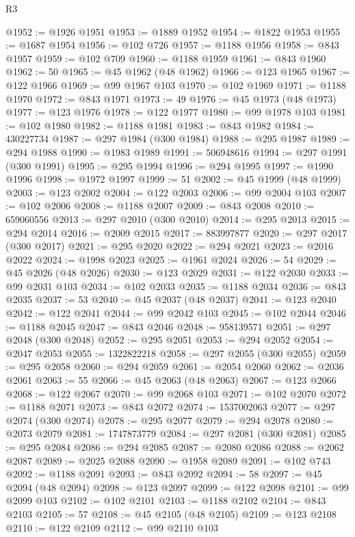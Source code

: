 \begin{lexlean}{R3}
\begin{coremodule}
@1952 := @1926 @1951
@1953 := @1889 @1952
@1954 := @1822 @1953
@1955 := @1687 @1954
@1956 := @102 @726
@1957 := @1188 @1956
@1958 := @843 @1957
@1959 := @102 @709
@1960 := @1188 @1959
@1961 := @843 @1960
@1962 := 50
@1965 := @45 @1962 (@48 @1962)
@1966 := @123 @1965
@1967 := @122 @1966
@1969 := @99 @1967 @103
@1970 := @102 @1969
@1971 := @1188 @1970
@1972 := @843 @1971
@1973 := 49
@1976 := @45 @1973 (@48 @1973)
@1977 := @123 @1976
@1978 := @122 @1977
@1980 := @99 @1978 @103
@1981 := @102 @1980
@1982 := @1188 @1981
@1983 := @843 @1982
@1984 := 430227734
@1987 := @297 @1984 (@300 @1984)
@1988 := @295 @1987
@1989 := @294 @1988
@1990 := @1983 @1989
@1991 := 506948616
@1994 := @297 @1991 (@300 @1991)
@1995 := @295 @1994
@1996 := @294 @1995
@1997 := @1990 @1996
@1998 := @1972 @1997
@1999 := 51
@2002 := @45 @1999 (@48 @1999)
@2003 := @123 @2002
@2004 := @122 @2003
@2006 := @99 @2004 @103
@2007 := @102 @2006
@2008 := @1188 @2007
@2009 := @843 @2008
@2010 := 659060556
@2013 := @297 @2010 (@300 @2010)
@2014 := @295 @2013
@2015 := @294 @2014
@2016 := @2009 @2015
@2017 := 883997877
@2020 := @297 @2017 (@300 @2017)
@2021 := @295 @2020
@2022 := @294 @2021
@2023 := @2016 @2022
@2024 := @1998 @2023
@2025 := @1961 @2024
@2026 := 54
@2029 := @45 @2026 (@48 @2026)
@2030 := @123 @2029
@2031 := @122 @2030
@2033 := @99 @2031 @103
@2034 := @102 @2033
@2035 := @1188 @2034
@2036 := @843 @2035
@2037 := 53
@2040 := @45 @2037 (@48 @2037)
@2041 := @123 @2040
@2042 := @122 @2041
@2044 := @99 @2042 @103
@2045 := @102 @2044
@2046 := @1188 @2045
@2047 := @843 @2046
@2048 := 958139571
@2051 := @297 @2048 (@300 @2048)
@2052 := @295 @2051
@2053 := @294 @2052
@2054 := @2047 @2053
@2055 := 1322822218
@2058 := @297 @2055 (@300 @2055)
@2059 := @295 @2058
@2060 := @294 @2059
@2061 := @2054 @2060
@2062 := @2036 @2061
@2063 := 55
@2066 := @45 @2063 (@48 @2063)
@2067 := @123 @2066
@2068 := @122 @2067
@2070 := @99 @2068 @103
@2071 := @102 @2070
@2072 := @1188 @2071
@2073 := @843 @2072
@2074 := 1537002063
@2077 := @297 @2074 (@300 @2074)
@2078 := @295 @2077
@2079 := @294 @2078
@2080 := @2073 @2079
@2081 := 1747873779
@2084 := @297 @2081 (@300 @2081)
@2085 := @295 @2084
@2086 := @294 @2085
@2087 := @2080 @2086
@2088 := @2062 @2087
@2089 := @2025 @2088
@2090 := @1958 @2089
@2091 := @102 @743
@2092 := @1188 @2091
@2093 := @843 @2092
@2094 := 58
@2097 := @45 @2094 (@48 @2094)
@2098 := @123 @2097
@2099 := @122 @2098
@2101 := @99 @2099 @103
@2102 := @102 @2101
@2103 := @1188 @2102
@2104 := @843 @2103
@2105 := 57
@2108 := @45 @2105 (@48 @2105)
@2109 := @123 @2108
@2110 := @122 @2109
@2112 := @99 @2110 @103

\end{coremodule}
\end{lexlean}
